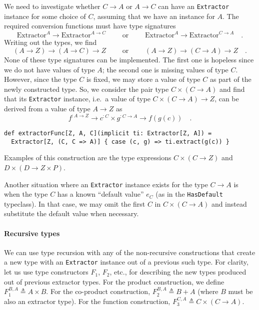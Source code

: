 We need to investigate whether $C\rightarrow A$ or $A\rightarrow C$
can have an \lstinline!Extractor! instance for some choice of $C$,
assuming that we have an instance for $A$. The required conversion
functions must have type signatures
\[
\text{Extractor}^{A}\rightarrow\text{Extractor}^{A\rightarrow C}\quad\quad\text{ or }\quad\quad\text{Extractor}^{A}\rightarrow\text{Extractor}^{C\rightarrow A}\quad.
\]
Writing out the types, we find
\[
\left(A\rightarrow Z\right)\rightarrow\left(A\rightarrow C\right)\rightarrow Z\quad\quad\text{ or }\quad\quad\left(A\rightarrow Z\right)\rightarrow\left(C\rightarrow A\right)\rightarrow Z\quad.
\]
None of these type signatures can be implemented. The first one is
hopeless since we do not have values of type $A$; the second one
is missing values of type $C$. However, since the type $C$ is fixed,
we may store a value of type $C$ as part of the newly constructed
type. So, we consider the pair type $C\times\left(C\rightarrow A\right)$
and find that its \lstinline!Extractor! instance, i.e.~a value of
type $C\times\left(C\rightarrow A\right)\rightarrow Z$, can be derived
from a value of type $A\rightarrow Z$ as
\[
f^{:A\rightarrow Z}\rightarrow c^{:C}\times g^{:C\rightarrow A}\rightarrow f(g(c))\quad.
\]
\begin{lstlisting}
def extractorFunc[Z, A, C](implicit ti: Extractor[Z, A]) =
  Extractor[Z, (C, C => A)] { case (c, g) => ti.extract(g(c)) }
\end{lstlisting}
Examples of this construction are the type expressions $C\times\left(C\rightarrow Z\right)$
and $D\times\left(D\rightarrow Z\times P\right)$.

Another situation where an \lstinline!Extractor! instance exists
for the type $C\rightarrow A$ is when the type $C$ has a known ``default
value'' $e_{C}$ (as in the \lstinline!HasDefault! typeclass). In
that case, we may omit the first $C$ in $C\times(C\rightarrow A)$
and instead substitute the default value when necessary.

\paragraph{Recursive types}

We can use type recursion with any of the non-recursive constructions
that create a new type with an \lstinline!Extractor! instance out
of a previous such type. For clarity, let us use type constructors
$F_{1}$, $F_{2}$, etc., for describing the new types produced out
of previous extractor types. For the product construction, we define
$F_{1}^{B,A}\triangleq A\times B$. For the co-product construction,
$F_{2}^{B,A}\triangleq B+A$ (where $B$ must be also an extractor
type). For the function construction, $F_{3}^{C,A}\triangleq C\times\left(C\rightarrow A\right)$.

